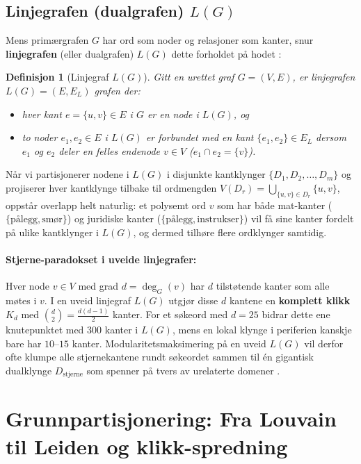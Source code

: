 \documentclass[11pt,a4paper]{article}
\newtheorem{definition}{Definisjon}
\begin{document}
\subsection{Linjegrafen (dualgrafen) $L(G)$}
Mens primærgrafen $G$ har ord som noder og relasjoner som kanter, snur \textbf{linjegrafen} (eller dualgrafen) $L(G)$ dette forholdet på hodet \cite{harary1960some, evans2009line, ahn2010link}:

\begin{definition}[Linjegraf $L(G)$]
Gitt en urettet graf $G = (V, E)$, er linjegrafen $L(G) = (E, E_L)$ grafen der:
\begin{itemize}
  \item hver kant $e = \{u, v\} \in E$ i $G$ er en node i $L(G)$, og
  \item to noder $e_1, e_2 \in E$ i $L(G)$ er forbundet med en kant $\{e_1, e_2\} \in E_L$ dersom $e_1$ og $e_2$ deler en felles endenode $v \in V$ ($e_1 \cap e_2 = \{v\}$).
\end{itemize}
\end{definition}

Når vi partisjonerer nodene i $L(G)$ i disjunkte kantklynger $\{D_1, D_2, \dots, D_m\}$ og projiserer hver kantklynge tilbake til ordmengden $V(D_r) = \bigcup_{\{u, v\} \in D_r} \{u, v\}$, oppstår overlapp helt naturlig: et polysemt ord $v$ som har både mat-kanter ($\{\text{pålegg}, \text{smør}\}$) og juridiske kanter ($\{\text{pålegg}, \text{instrukser}\}$) vil få sine kanter fordelt på ulike kantklynger i $L(G)$, og dermed tilhøre flere ordklynger samtidig.

\paragraph{Stjerne-paradokset i uveide linjegrafer:}
Hver node $v \in V$ med grad $d = \deg_G(v)$ har $d$ tilstøtende kanter som alle møtes i $v$. I en uveid linjegraf $L(G)$ utgjør disse $d$ kantene en \textbf{komplett klikk $K_d$} med $\binom{d}{2} = \frac{d(d-1)}{2}$ kanter. For et søkeord med $d = 25$ bidrar dette ene knutepunktet med $300$ kanter i $L(G)$, mens en lokal klynge i periferien kanskje bare har $10\text{--}15$ kanter. Modularitetsmaksimering på en uveid $L(G)$ vil derfor ofte klumpe alle stjernekantene rundt søkeordet sammen til én gigantisk dualklynge $D_{\text{stjerne}}$ som spenner på tvers av urelaterte domener \cite{evans2009line}.

\section{Grunnpartisjonering: Fra Louvain til Leiden og klikk-spredning}
\end{document}
